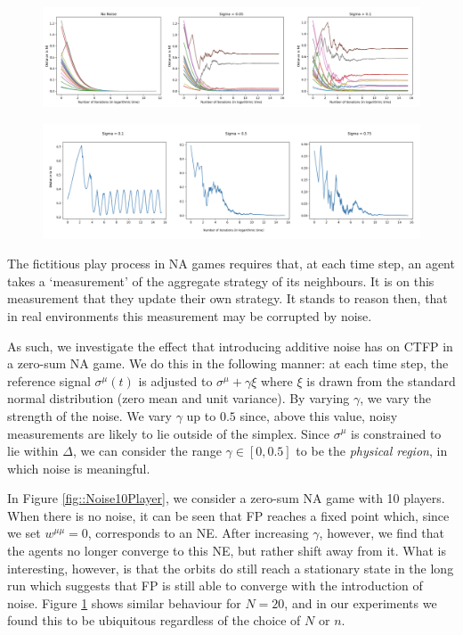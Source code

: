 \documentclass{article}
\theoremstyle{definition}
\newcommand{\refmu}{\sigma^{\mu}}
\begin{document}
  \begin{figure}[t]
    \centering
    \includegraphics[width = \columnwidth]{Figures/Noise20Player.png}
    \caption{\label{fig::Noise20Player}}
  \end{figure}

  \begin{figure}[t]
    \centering
    \includegraphics[width = \columnwidth]{Figures/3PlayerChainNoise.png}
    \caption{\label{fig::3PlayerChainNoise}}
  \end{figure}

  The fictitious play process in NA games requires that, at each time step, an agent takes a
  `measurement' of the aggregate strategy of its neighbours. It is on this measurement that they
  update their own strategy. It stands to reason then, that in real environments this measurement
  may be corrupted by noise. 
  
  As such, we investigate the effect that introducing additive noise has
  on CTFP in a zero-sum NA game. We do this in the following manner: at each time step, the
  reference signal $\refmu(t)$ is adjusted to $\refmu + \gamma \xi$ where $\xi$ is drawn from the
  standard normal distribution (zero mean and unit variance). By varying $\gamma$, we vary the
  strength of the noise. We vary $\gamma$ up to $0.5$ since, above this value, noisy measurements
  are likely to lie outside of the simplex. Since $\refmu$ is constrained to lie within $\Delta$, we
  can consider the range $\gamma \in [0, 0.5]$ to be the \emph{physical region}, in which noise is meaningful.

  In Figure \ref{fig::Noise10Player}, we consider a zero-sum NA game with 10 players. When there is
  no noise, it can be seen that FP reaches a fixed point which, since we set $w^{\mu \mu} = 0$,
  corresponds to an NE. After increasing $\gamma$, however, we find that the agents no longer
  converge to this NE, but rather shift away from it. What is interesting, however, is that the
  orbits do still reach a stationary state in the long run which suggests that FP is still able to
  converge with the introduction of noise. Figure \ref{fig::Noise20Player} shows similar behaviour
  for $N = 20$, and in our experiments we found this to be ubiquitous regardless of the choice of
  $N$ or $n$. 
\end{document}
